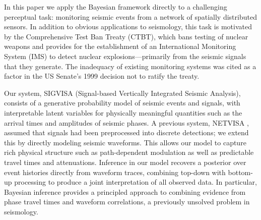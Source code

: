 \documentclass[twoside]{article} \usepackage{aistats2017}
\begin{document}
In this paper we apply the Bayesian framework directly to a
challenging perceptual task: monitoring seismic events from a network
of spatially distributed sensors. In addition to obvious applications
to seismology, this task is motivated by the Comprehensive Test Ban
Treaty (CTBT), which bans testing of nuclear weapons and provides for
the establishment of an International Monitoring System (IMS) to
detect nuclear explosions---primarily from the seismic signals that
they generate. The inadequacy of existing monitoring systems was cited as a
factor in the US Senate's 1999 decision not to ratify the treaty. 

Our system, SIGVISA (Signal-based Vertically Integrated Seismic
Analysis), consists of a generative probability model of seismic
events and signals, with interpretable latent variables for 
physically meaningful quantities such as the arrival times and
amplitudes of seismic phases. A previous system, NETVISA \citep{arora2013net}, assumed that
signals had been preprocessed into discrete detections; we extend this
by directly modeling seismic waveforms. This allows our model to
capture rich physical structure such as path-dependent modulation as
well as predictable travel times and attenuations. Inference in our model
recovers a posterior over event histories directly from
waveform traces, combining top-down with bottom-up processing to
produce a joint interpretation of all observed data. In particular,
Bayesian inference provides a principled approach to combining
evidence from phase travel times and waveform correlations, a previously unsolved problem in
seismology. 


\end{document}
